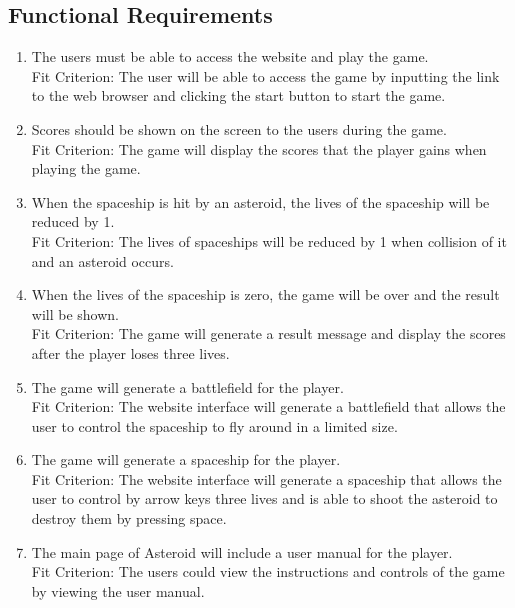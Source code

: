 \documentclass[12pt, titlepage]{article}
\begin{document}
\subsection{Functional Requirements}
\begin{enumerate}[{FR}1.]
    \item The users must be able to access the website and play the game.\\
        Fit Criterion:  The user will be able to access the game by inputting the link to the web browser and clicking the start button to start the game.
        \item Scores should be shown on the screen to the users during the game. \\
        Fit Criterion: The game will display the scores that the player gains when playing the game.
		
		\item When the spaceship is hit by an asteroid, the lives of the spaceship will be reduced by 1.\\
        Fit Criterion: The lives of spaceships will be reduced by 1 when collision of it and an asteroid occurs.
        
        \item When the lives of the spaceship is zero, the game will be over and the result will be shown.\\
        Fit Criterion: The game will generate a result message and display the scores after the player loses three lives.
       
        \item The game will generate a battlefield for the player.\\
         Fit Criterion: The website interface will generate a battlefield that allows the user to control the spaceship to fly around in a limited size.

        \item The game will generate a spaceship for the player.\\
         Fit Criterion: The website interface will generate a spaceship that allows the user to control by arrow keys three lives and is able to shoot the asteroid to destroy them by pressing space.

        \item The main page of Asteroid will include a user manual for the player.\\
	Fit Criterion: The users could view the instructions and controls of the game by viewing the user manual. 


\end{enumerate}
\end{document}
